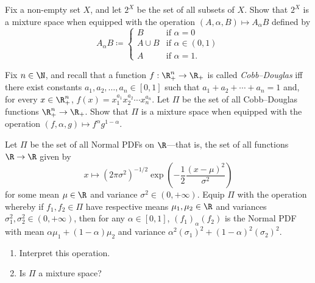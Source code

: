 \begin{exercise}
	\label{exercise:sets}
	Fix a non-empty set $X$, and let $2^X$ be the set of all subsets of $X$. Show that $2^X$ is a mixture space when equipped with the operation $(A,\alpha,B) \mapsto A_\alpha B$ defined by
	\begin{equation*}
		A_\alpha B \coloneqq
		\begin{cases}
			B & \text{if $\alpha=0$} \\
			A \cup B & \text{if $\alpha \in (0,1)$} \\
			A & \text{if $\alpha=1$.} 
		\end{cases}
	\end{equation*}
\end{exercise}

\begin{exercise}
	\label{exercise:mix_utility}
	Fix $n \in \N$, and recall that a function $f : \R_+^n \to \R_+$ is called \emph{Cobb--Douglas} iff there exist constants $a_1,a_2,\dots,a_n \in [0,1]$ such that $a_1 + a_2 + \cdots + a_n = 1$ and, for every $x \in \R_+^n$, $f(x) = x_1^{a_1} x_2^{a_2} \cdots x_n^{a_n}$. Let $\Pi$ be the set of all Cobb--Douglas functions $\R_+^n \to \R_+$. Show that $\Pi$ is a mixture space when equipped with the operation $(f,\alpha,g) \mapsto f^\alpha g^{1-\alpha}$.
\end{exercise}

\begin{exercise}
	\label{exercise:mix_normals}
	Let $\Pi$ be the set of all Normal PDFs on $\R$---that is, the set of all functions $\R \to \R$ given by
	\begin{equation*}
		x \mapsto \left( 2\pi\sigma^2 \right)^{-1/2} \exp\left( -\frac{1}{2} \frac{(x-\mu)^2}{\sigma^2} \right)
	\end{equation*}
	for some mean $\mu \in \R$ and variance $\sigma^2 \in (0,+\infty)$. Equip $\Pi$ with the operation whereby if $f_1,f_2 \in \Pi$ have respective means $\mu_1,\mu_2 \in \R$ and variances $\sigma_1^2,\sigma_2^2 \in (0,+\infty)$, then for any $\alpha \in [0,1]$, $(f_1)_\alpha (f_2)$ is the Normal PDF with mean $\alpha \mu_1 + (1-\alpha) \mu_2$ and variance $\alpha^2 (\sigma_1)^2 + (1-\alpha)^2 (\sigma_2)^2$.

	\begin{enumerate}[label=(\alph*)]
	
		\item Interpret this operation.

		\item Is $\Pi$ a mixture space?
	
	\end{enumerate}
\end{exercise}

